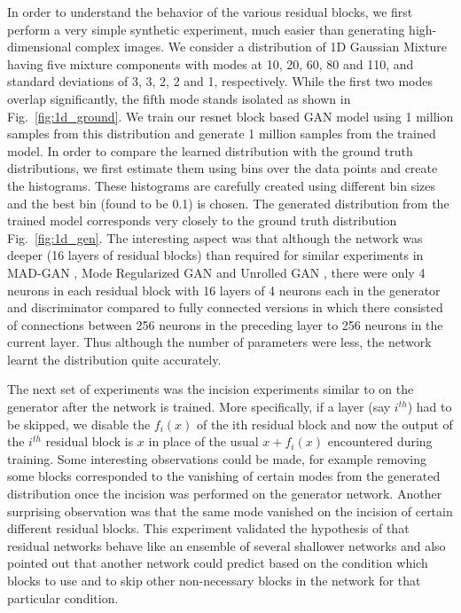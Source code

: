 \documentclass[10pt,twocolumn,letterpaper]{article}
\def\figref#1{Fig.~\ref{#1}}
\begin{document}
In order to understand the behavior of the various residual blocks, we first perform a very simple synthetic experiment, much easier than generating high-dimensional complex images. We consider a distribution of 1D Gaussian Mixture \cite{bishop2007pattern} having five mixture components with modes at 10, 20, 60, 80 and 110, and standard deviations of 3, 3, 2, 2 and 1, respectively. While the first two modes overlap significantly, the fifth mode stands isolated as shown in \figref{fig:1d_ground}. We train our resnet block based GAN model using 1 million samples from this distribution and generate 1 million samples from the trained model. In order to compare the learned distribution with the ground truth distributions, we first estimate them using bins over the data points and create the histograms. These histograms are carefully created using different bin sizes and the best bin (found to be 0.1) is chosen. The generated distribution from the trained model corresponds very closely to the ground truth distribution \figref{fig:1d_gen}. The interesting aspect was that although the network was deeper (16 layers of residual blocks) than required for similar experiments in MAD-GAN \cite{ghosh2017multi}, Mode Regularized GAN \cite{che2016mode} and Unrolled GAN \cite{metz2017unrolledGAN}, there were only 4 neurons in each residual block with 16 layers of 4 neurons each in the generator and discriminator compared to fully connected versions in which there consisted of connections between 256 neurons in the preceding layer to 256 neurons in the current layer. Thus although the number of parameters were less, the network learnt the distribution quite accurately.

The next set of experiments was the incision experiments similar to \cite{veit2016residual} on the generator after the network is trained. More specifically, if a layer (say $i^{th}$) had to be skipped, we disable the $f_i(x)$ of the ith residual block and now the output of the $i^{th}$ residual block is $x$ in place of the usual $x+f_i(x)$ encountered during training. Some interesting observations could be made, for example removing some blocks corresponded to the vanishing of certain modes from the generated distribution once the incision was performed on the generator network. Another surprising observation was that the same mode vanished on the incision of certain different residual blocks. This experiment validated the hypothesis of \cite{veit2016residual} that residual networks behave like an ensemble of several shallower networks and also pointed out that another network could predict based on the condition which blocks to use and to skip other non-necessary blocks in the network for that particular condition.
\end{document}
